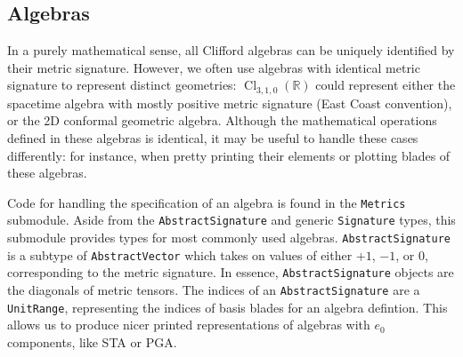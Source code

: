 \documentclass{juliacon}
\DeclareMathOperator{\Cl}{Cl}
\newcommand{\ClR}[1]{\Cl_{#1}\left(\mathbb{R}\right)}
\begin{document}
\subsection{Algebras}

In a purely mathematical sense, all Clifford algebras can be uniquely identified by their metric signature.
However, we often use algebras with identical metric signature to represent distinct geometries:
$\ClR{3,1,0}$ could represent either the spacetime algebra with mostly positive metric signature (East Coast convention), or the 2D conformal geometric algebra.
Although the mathematical operations defined in these algebras is identical, it may be useful to handle these cases differently: for instance, when pretty printing their elements or plotting blades of these algebras.

Code for handling the specification of an algebra is found in the \texttt{Metrics} submodule.
Aside from the \texttt{AbstractSignature} and generic \texttt{Signature} types, this submodule provides types for most commonly used algebras.
\texttt{AbstractSignature} is a subtype of \texttt{AbstractVector} which takes on values of either $+1$, $-1$, or $0$, corresponding to the metric signature.
In essence, \texttt{AbstractSignature} objects are the diagonals of metric tensors.
The indices of an \texttt{AbstractSignature} are a \texttt{UnitRange}, representing the indices of basis blades for an algebra defintion.
This allows us to produce nicer printed representations of algebras with $e_0$ components, like STA or PGA.
\end{document}
